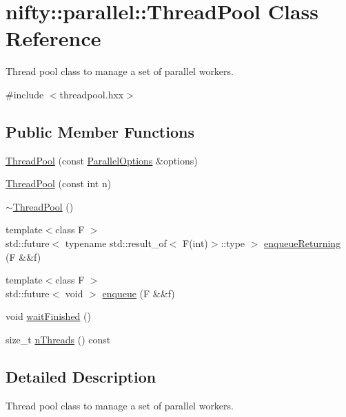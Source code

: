 \hypertarget{classnifty_1_1parallel_1_1ThreadPool}{}\section{nifty\+:\+:parallel\+:\+:Thread\+Pool Class Reference}
\label{classnifty_1_1parallel_1_1ThreadPool}


Thread pool class to manage a set of parallel workers.  




{\ttfamily \#include $<$threadpool.\+hxx$>$}

\subsection*{Public Member Functions}
\begin{DoxyCompactItemize}
\item 
\hyperlink{classnifty_1_1parallel_1_1ThreadPool_a43dcc819b5ac947b6f68a774d6fc40e7}{Thread\+Pool} (const \hyperlink{classnifty_1_1parallel_1_1ParallelOptions}{Parallel\+Options} \&options)
\item 
\hyperlink{classnifty_1_1parallel_1_1ThreadPool_ac6ddbc44375bf1ae46b73707c7eabf85}{Thread\+Pool} (const int n)
\item 
\hyperlink{group__ParallelProcessing_ga77c519ec32559623c64d61f532c570b8}{$\sim$\+Thread\+Pool} ()
\item 
{\footnotesize template$<$class F $>$ }\\std\+::future$<$ typename std\+::result\+\_\+of$<$ F(int)$>$\+::type $>$ \hyperlink{group__ParallelProcessing_ga5ffeb64ca8f60c37ad2db97bf80b05af}{enqueue\+Returning} (F \&\&f)
\item 
{\footnotesize template$<$class F $>$ }\\std\+::future$<$ void $>$ \hyperlink{group__ParallelProcessing_ga030f79847ecd6a609877dd5f997ac875}{enqueue} (F \&\&f)
\item 
void \hyperlink{classnifty_1_1parallel_1_1ThreadPool_a72bcedd7dfdb99fe347ee9da0a80cabd}{wait\+Finished} ()
\item 
size\+\_\+t \hyperlink{classnifty_1_1parallel_1_1ThreadPool_aa826f97a6941c9dc9d3b265240077875}{n\+Threads} () const
\end{DoxyCompactItemize}


\subsection{Detailed Description}
Thread pool class to manage a set of parallel workers. 

